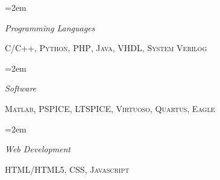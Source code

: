 \documentclass[paper=a4,fontsize=11pt]{scrartcl} %
\newlength{\spacebox}
\newcommand{\sepspace}{\vspace*{1em}}		%
\newcommand{\NewPart}[1]{\section*{\uppercase{#1}}}
\newcommand{\PersonalEntry}[2]{
		\noindent\hangindent=2em\hangafter=0 %
		\parbox{\spacebox}{        %
		\textit{#1}}		       %
		\hspace{1.5em} #2 \par}    %
\newcommand{\SkillsEntry}[2]{      %
		\noindent\hangindent=2em\hangafter=0 %
		\parbox{\spacebox}{        %
		\textit{#1}}			   %
		\hspace{1.5em} #2 \par}    %
\begin{document}

\SkillsEntry{Programming Languages}{\textsc{C/C++}, \textsc{Python}, \textsc{PHP}, \textsc{Java}, \textsc{VHDL}, \textsc{System Verilog}}
\sepspace

\SkillsEntry{Software}{\textsc{Matlab}, \textsc{PSPICE}, \textsc{LTSPICE}, \textsc{Virtuoso}, \textsc{Quartus}, \textsc{Eagle}}
\sepspace
\SkillsEntry{Web Development}{\textsc{HTML/HTML5}, \textsc{CSS}, \textsc{Javascript}}




\end{document}
